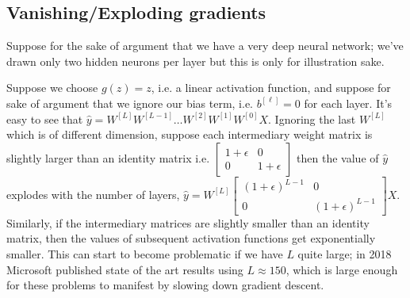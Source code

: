 \documentclass[12pt]{article}
\begin{document}
\subsection{Vanishing/Exploding gradients}
Suppose for the sake of argument that we have a very deep neural network; we've drawn only two hidden neurons per layer but this is only for illustration sake.

{
\centering
{}
}

Suppose we choose $g(z) = z$, i.e. a linear activation function, and suppose for sake of argument that we ignore our bias term, i.e. $b^{[\ell]} = 0$ for each layer. It's easy to see that $\hat y = W^{[L]} W^{[L-1]} \ldots W^{[2]} W^{[1]} W^{[0]} X$. Ignoring the last $W^{[L]}$ which is of different dimension, suppose each intermediary weight matrix is slightly larger than an identity matrix i.e. $\begin{bmatrix}   1 + \epsilon & 0 \\ 0 & 1 + \epsilon \end{bmatrix}$ then the value of $\hat y$ explodes with the number of layers,
$\hat y = W^{[L]} \begin{bmatrix}   (1 + \epsilon)^{L-1} & 0 \\ 0 & (1 + \epsilon)^{L-1} \end{bmatrix}X$. Similarly, if the intermediary matrices are slightly smaller than an identity matrix, then the values of subsequent activation functions get exponentially smaller. This can start to become problematic if we have $L$ quite large; in 2018 Microsoft published state of the art results using $L \approx 150$, which is large enough for these problems to manifest by slowing down gradient descent.
\end{document}
